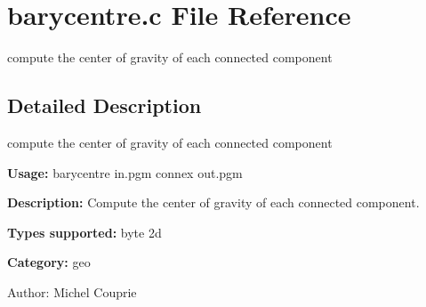 \section{barycentre.c File Reference}
\label{barycentre_8c}
compute the center of gravity of each connected component 



\subsection{Detailed Description}
compute the center of gravity of each connected component 

{\bf Usage:} barycentre in.pgm connex out.pgm

{\bf Description:} Compute the center of gravity of each connected component.

{\bf Types supported:} byte 2d

{\bf Category:} geo

\begin{Desc}
\item[Author:]Michel Couprie \end{Desc}
